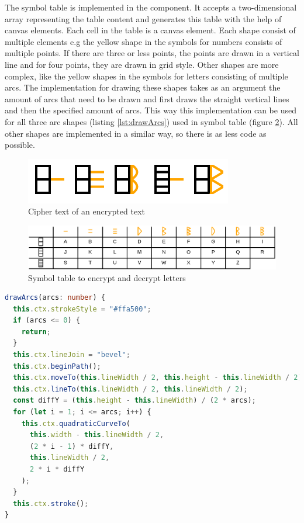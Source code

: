 The symbol table is implemented in the  component. It accepts a two-dimensional array representing the table content and generates this table with the help of canvas elements. Each cell in the table is a canvas element. Each shape consist of multiple elements e.g the yellow shape in the symbols for numbers consists of multiple points. If there are three or less points, the points are drawn in a vertical line and for four points, they are drawn in grid style. Other shapes are more complex, like the yellow shapes in the symbols for letters consisting of multiple arcs. The implementation for drawing these shapes takes as an argument the amount of arcs that need to be drawn and first draws the straight vertical lines and then the specified amount of arcs. This way this implementation can be used for all three arc shapes (listing \ref{lst:drawArcs}) used in symbol table (figure \ref{fig:symboltable_letters}). 
All other shapes are implemented in a similar way, so there is as less code as possible.

\begin{figure} 
    \centering
    \includegraphics[width=0.4 \columnwidth]{figures/cipher_text.png}
    \caption{Cipher text of an encrypted text} 
    \label{fig:cipher_text} 
\end{figure}

\begin{figure} 
    \centering
    \includegraphics[width=1.0 \columnwidth]{figures/symboltable_letters.png}
    \caption{Symbol table to encrypt and decrypt letters} 
    \label{fig:symboltable_letters} 
\end{figure}

\begin{lstlisting}[language=TypeScript,caption={Implementation of drawing a variable amount of arc symbols},label={lst:drawArcs}]
drawArcs(arcs: number) {
  this.ctx.strokeStyle = "#ffa500";
  if (arcs <= 0) {
    return;
  }
  this.ctx.lineJoin = "bevel";
  this.ctx.beginPath();
  this.ctx.moveTo(this.lineWidth / 2, this.height - this.lineWidth / 2);
  this.ctx.lineTo(this.lineWidth / 2, this.lineWidth / 2);
  const diffY = (this.height - this.lineWidth) / (2 * arcs);
  for (let i = 1; i <= arcs; i++) {
    this.ctx.quadraticCurveTo(
      this.width - this.lineWidth / 2,
      (2 * i - 1) * diffY,
      this.lineWidth / 2,
      2 * i * diffY
    );
  }
  this.ctx.stroke();
}
\end{lstlisting}

